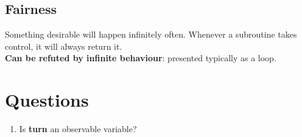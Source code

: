 \documentclass[11pt]{article}
\begin{document}
\subsection{Fairness} %
\label{sub:fairness}
Something desirable will happen infinitely often. Whenever a subroutine takes control, it will always return it.\\
\textbf{Can be refuted by infinite behaviour}: presented typically as a loop.




\section{Questions} %
\label{sec:questions}
\begin{enumerate}
	\item Is \textbf{turn} an observable variable?
\end{enumerate}
\end{document}
